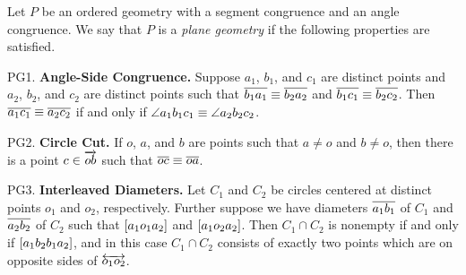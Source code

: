 \begin{dfn}
Let \(P\) be an ordered geometry with a segment congruence and an angle congruence.
We say that \(P\) is a \emph{plane geometry} if the following properties are satisfied.
\begin{proplist}
\item[PG1.] \textbf{Angle-Side Congruence.} Suppose \(a_1\), \(b_1\), and \(c_1\) are distinct points and \(a_2\), \(b_2\), and \(c_2\) are distinct points such that \(\overline{b_1a_1} \equiv \overline{b_2a_2}\) and \(\overline{b_1c_1} \equiv \overline{b_2c_2}\).
Then \(\overline{a_1c_1} \equiv \overline{a_2c_2}\) if and only if \(\angle{a_1b_1c_1} \equiv \angle{a_2b_2c_2}\).

\item[PG2.] \textbf{Circle Cut.} If \(o\), \(a\), and \(b\) are points such that \(a \neq o\) and \(b \neq o\), then there is a point \(c \in \overrightarrow{ob}\) such that \(\overline{oc} \equiv \overline{oa}\).

\begin{center}
\end{center}

\item[PG3.] \textbf{Interleaved Diameters.} Let \(C_1\) and \(C_2\) be circles centered at distinct points \(o_1\) and \(o_2\), respectively.
Further suppose we have diameters \(\overline{a_1b_1}\) of \(C_1\) and \(\overline{a_2b_2}\) of \(C_2\) such that \([ a_1 o_1 a_2 ]\) and \([ a_1 o_2 a_2 ]\).
Then \(C_1 \cap C_2\) is nonempty if and only if \([ a_1b_2b_1a_2 ]\), and in this case \(C_1 \cap C_2\) consists of exactly two points which are on opposite sides of \(\overleftrightarrow{o_1o_2}\).


\end{proplist}
\end{dfn}
